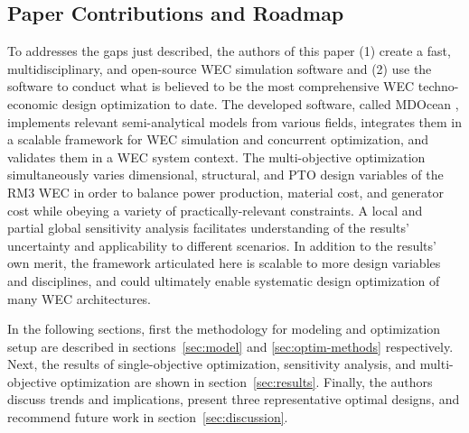 \subsection{Paper Contributions and Roadmap}
To addresses the gaps just described, the authors of this paper (1) create a fast, multidisciplinary, and open-source WEC simulation software and (2) use the software to conduct what is believed to be the most comprehensive WEC techno-economic design optimization to date. The developed software, called MDOcean \cite{mccabe_mdocean_2024}, implements relevant semi-analytical models from various fields, integrates them in a scalable framework for WEC simulation and concurrent optimization, and validates them in a WEC system context. The multi-objective optimization simultaneously varies dimensional, structural, and PTO design variables of the RM3 WEC in order to balance power production, material cost, and generator cost while obeying a variety of practically-relevant constraints. A local and partial global sensitivity analysis facilitates understanding of the results' uncertainty and applicability to different scenarios. In addition to the results' own merit, the framework articulated here is scalable to more design variables and disciplines, and could ultimately enable systematic design optimization of many WEC architectures.

In the following sections, first the methodology for modeling and optimization setup are described in sections~\ref{sec:model} and \ref{sec:optim-methods} respectively. Next, the results of single-objective optimization, sensitivity analysis, and multi-objective optimization are shown in section~\ref{sec:results}. Finally, the authors discuss trends and implications, present three representative optimal designs, and recommend future work in section~\ref{sec:discussion}.
